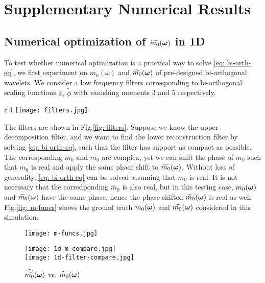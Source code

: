 \section{Supplementary Numerical Results}\label{app: supp-numerical}
\subsection{Numerical optimization of $\m{0}$ in 1D}
To test whether numerical optimization is a practical way to solve \eqref{eq: bi-orth-eq}, we first experiment on $m_0(\omega)$ and $\m{0}$ of pre-designed bi-orthogonal wavelets. We consider a low frequency filters corresponding to bi-orthogonal scaling functions $\phi,\, \tilde{\phi}$ with vanishing moments 3 and 5 respectively. 

\begin{wrapfigure}{r}{.4\textwidth}
\texttt{[image: filters.jpg]}
\caption{1d filters, up: LoD, down: LoR}
\label{fig: filters}
\end{wrapfigure}
The filters are shown in Fig.\ref{fig: filters}. Suppose we know the upper decomposition filter, and we want to find the lower reconstruction filter by solving \eqref{eq: bi-orth-eq}, such that the filter has support as compact as possible. The corresponding $m_0$ and $\widetilde{m_0}$ are complex, yet we can shift the phase of $m_0$ such that $m_0$ is real and apply the same phase shift to $\m{0}$. Without loss of generality, \eqref{eq: bi-orth-eq} can be solved assuming that $m_0$ is  real.
It is not necessary that the corredponding $\widetilde{m_0}$ is also real, but in this testing case, $m_0(\V{\omega})$ and $\m{0}$ have the same phase, hence the phase-shifted $\m{0}$ is real as well. Fig.\ref{fig: m-funcs} shows the ground truth $m_0(\V{\omega})$ and $\m{0}$ considered in this simulation. %
\begin{figure}%
\begin{minipage}{.5\textwidth}
\texttt{[image: m-funcs.jpg]}
\caption{$m_0(\V{\omega})$ and $\m{0}$}
\label{fig: m-funcs}
\end{minipage}
\hfill
\begin{minipage}{.4\textwidth}
\texttt{[image: 1d-m-compare.jpg]}\\
\texttt{[image: 1d-filter-compare.jpg]}
\caption{$\widehat{\widetilde{m_{0}}}(\boldsymbol{\omega})$ vs. $\m{0}$}
\label{fig: 1d-compare}
\end{minipage}
\end{figure}

